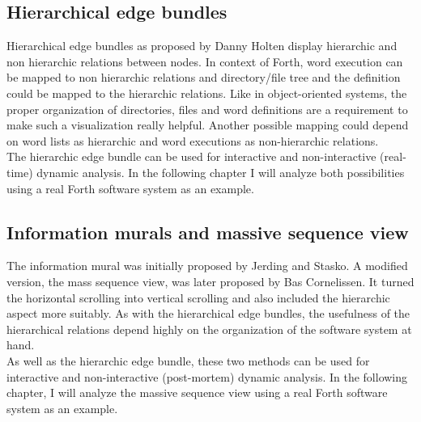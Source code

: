 \subsection*{Hierarchical edge bundles}
Hierarchical edge bundles as proposed by Danny Holten\cite{Holten:2006:HEB:1187627.1187772} display hierarchic and non hierarchic relations between nodes. In context of Forth, word execution can be mapped to non hierarchic relations and directory/file tree and the definition could be mapped to the hierarchic relations. Like in object-oriented systems, the proper organization of directories, files and word definitions are a requirement to make such a visualization really helpful.
Another possible mapping could depend on word lists as hierarchic and word executions as non-hierarchic relations.
\\
The hierarchic edge bundle can be used for interactive and non-interactive (real-time) dynamic analysis. In the following chapter I will analyze both possibilities using a real Forth software system as an example.

\subsection*{Information murals and massive sequence view}
The information mural was initially proposed by Jerding and Stasko\cite{Jerding:1998:IMT:614271.614408}. A modified version, the mass sequence view, was later proposed by Bas Cornelissen\cite{Cornelissen2009}. It turned the horizontal scrolling into vertical scrolling and also included the hierarchic aspect more suitably. As with the hierarchical edge bundles, the usefulness of the hierarchical relations depend highly on the organization of the software system at hand.
\\
As well as the hierarchic edge bundle, these two methods can be used for interactive and non-interactive (post-mortem) dynamic analysis. In the following chapter, I will analyze the massive sequence view using a real Forth software system as an example.

